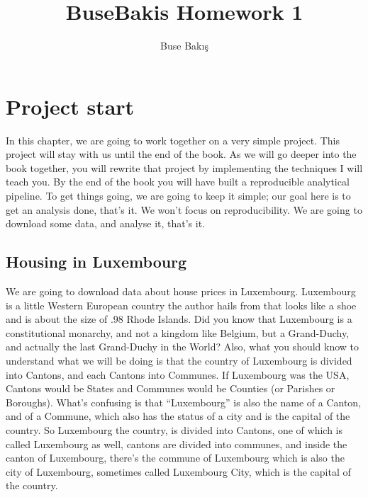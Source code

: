 \documentclass[
  letterpaper,
  DIV=11,
  numbers=noendperiod]{scrartcl}
\title{BuseBakis Homework 1}
\author{Buse Bakış}
\date{}
\begin{document}
\maketitle
\ifdefined\Shaded\renewenvironment{Shaded}{\begin{tcolorbox}[breakable, sharp corners, borderline west={3pt}{0pt}{shadecolor}, interior hidden, enhanced, boxrule=0pt, frame hidden]}{\end{tcolorbox}}\fi

\hypertarget{project-start}{%
\section{Project start}\label{project-start}}

In this chapter, we are going to work together on a very simple project.
This project will stay with us until the end of the book. As we will go
deeper into the book together, you will rewrite that project by
implementing the techniques I will teach you. By the end of the book you
will have built a reproducible analytical pipeline. To get things going,
we are going to keep it simple; our goal here is to get an analysis
done, that's it. We won't focus on reproducibility. We are going to
download some data, and analyse it, that's it.

\hypertarget{housing-in-luxembourg}{%
\subsection{Housing in Luxembourg}\label{housing-in-luxembourg}}

We are going to download data about house prices in Luxembourg.
Luxembourg is a little Western European country the author hails from
that looks like a shoe and is about the size of .98 Rhode Islands. Did
you know that Luxembourg is a constitutional monarchy, and not a kingdom
like Belgium, but a Grand-Duchy, and actually the last Grand-Duchy in
the World? Also, what you should know to understand what we will be
doing is that the country of Luxembourg is divided into Cantons, and
each Cantons into Communes. If Luxembourg was the USA, Cantons would be
States and Communes would be Counties (or Parishes or Boroughs). What's
confusing is that ``Luxembourg'' is also the name of a Canton, and of a
Commune, which also has the status of a city and is the capital of the
country. So Luxembourg the country, is divided into Cantons, one of
which is called Luxembourg as well, cantons are divided into communes,
and inside the canton of Luxembourg, there's the commune of Luxembourg
which is also the city of Luxembourg, sometimes called Luxembourg City,
which is the capital of the country.
\end{document}
